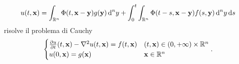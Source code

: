 \begin{equation}
    u(t,\mathbf{x})=\int_{\mathbb{R}^n}\Phi(t,\mathbf{x}-\mathbf{y})g(\mathbf{y})\,\textup{d}^ny+\int_0^t\int_{\mathbb{R}^n}\Phi(t-s,\mathbf{x}-\mathbf{y})f(s,\mathbf{y})\,\textup{d}^ny\,\textup{d} s
    \label{eq:soluzione-generale-equazione-calore}
\end{equation}
risolve il problema di Cauchy
\begin{equation}
    \begin{cases}
        \frac{\partial {u}}{\partial {t}}(t,\mathbf{x})-\nabla^2 u(t,\mathbf{x})=f(t,\mathbf{x}) & (t,\mathbf{x})\in(0,+\infty)\times\mathbb{R}^n\\
        u(0,\mathbf{x})=g(\mathbf{x})                             & \mathbf{x}\in\mathbb{R}^n
    \end{cases}.
    \label{eq:problema-cauchy-equazione-calore}
\end{equation}
